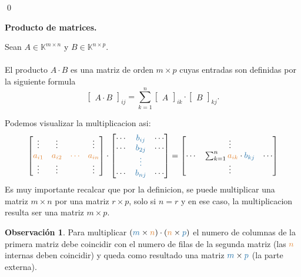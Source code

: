 \documentclass{article}
\theoremstyle{definition}
\theoremstyle{definition}
\newtheorem*{obs}{Observación}
\theoremstyle{remark}
\begin{document}
\qed
\begin{center}
\textbf{Producto de matrices.}
\end{center}
\begin{defi}
  Sean $A \in \mathbb{K}^{m \times n}$ y $B\in \mathbb{K}^{n \times p}$. \\\\
  El producto $A \cdot B$ es una matriz de orden $m \times p$ cuyas entradas son definidas por la siguiente formula \[
  \begin{bmatrix} A \cdot B \end{bmatrix}_{ij}=\sum_{k = 1 } ^ {n} {\begin{bmatrix}A \end{bmatrix}_{ik} \cdot \begin{bmatrix} B \end{bmatrix}_{kj}}.
  \]
\end{defi}
 Podemos visualizar la multiplicacion asi: \[
  \begin{bmatrix} \vdots & \vdots & & \vdots \\
    \textcolor{rojop2}{a_{i1}} & \textcolor{rojop2}{a_{i2}} & \textcolor{rojop2}{\cdots} & \textcolor{rojop2}{a_{in}} \\
    \vdots & \vdots && \vdots \end{bmatrix} \cdot \begin{bmatrix}\cdots & \textcolor{azulp2}{b_{ij}} & \cdots \\
    \cdots & \textcolor{azulp2}{b_{2j}} & \cdots \\
           & \textcolor{azulp2}{\vdots} \\
    \cdots & \textcolor{azulp2}{b_{nj}} & \cdots \end{bmatrix} = \begin{bmatrix} & \vdots & \\
  \cdots & \sum_{k=1} ^ n \textcolor{rojop2}{a_{ik}}\cdot \textcolor{azulp2}{b_{kj}}& \cdots \\
         & \vdots \end{bmatrix}
\]
Es muy importante recalcar que por la definicion, se puede multiplicar una matriz $ m \times n$ por una matriz $ r \times p$, solo si $ n= r $ y en ese caso, la multiplicacion resulta ser una matriz $ m \times p$.
\begin{obs}
  Para multiplicar $(\textcolor{azulp2}{m} \times \textcolor{rojop2}{n})\cdot (\textcolor{rojop2}{n} \times \textcolor{azulp2}{p})$ el numero de columnas de la primera matriz debe coincidir con el numero de filas de la segunda matriz (las $\textcolor{rojop2}{n}$ internas deben coincidir) y queda como resultado una matriz $ \textcolor{azulp2}{m} \times \textcolor{azulp2}{p}$ (la parte externa).\end{obs}
\end{document}
